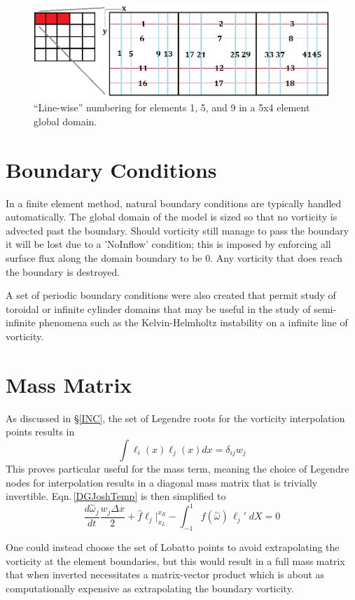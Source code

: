 \documentclass[letterpaper,12pt]{report}
\newcommand{\be}{\begin{equation}}
\newcommand{\ben}[1]{\begin{equation}\label{#1}}
\newcommand{\ee}{\end{equation}}
\newcommand{\aomega}{\overset{\sim}{\omega}}				%
\begin{document}
\begin{figure}
\centering
\includegraphics[width=6in]{streams.PNG}
\caption{\label{fig:streams}``Line-wise'' numbering for elements 1, 5, and 9 in a 5x4 element global domain.}
\end{figure}

%
\section{Boundary Conditions}
In a finite element method, natural boundary conditions are typically handled automatically. The global domain of the model is sized so that no vorticity is advected past the boundary. Should vorticity still manage to pass the boundary it will be lost due to a 'NoInflow' condition; this is imposed by enforcing all surface flux along the domain boundary to be 0. Any vorticity that does reach the boundary is destroyed.

A set of periodic boundary conditions were also created that permit study of toroidal or infinite cylinder domains that may be useful in the study of semi-infinite phenomena such as the Kelvin-Helmholtz instability on a infinite line of vorticity.

%
\section{Mass Matrix}\label{MassM}
As discussed in \S\ref{INC}, the set of Legendre roots for the vorticity interpolation points results in
\be \int \ell_i(x) \ell_j(x) dx = \delta_{ij} w_j \ee
This proves particular useful for the mass term, meaning the choice of Legendre nodes for interpolation results in a diagonal mass matrix that is trivially invertible.  Eqn.\,\eqref{DGJoshTemp} is then simplified to
\ben{DGJoshTemp2} \frac{d \aomega_j}{dt} \frac{w_j \Delta x}{2}
+\hat{f}\ell_j \Big|^{x_R}_{x_L} 
- \int_{-1}^{1} f(\aomega) \, \ell_j' \;dX = 0 \ee

One could instead choose the set of Lobatto points to avoid extrapolating the vorticity at the element boundaries, but this would result in a full mass matrix that when inverted necessitates a matrix-vector product which is about as computationally expensive as extrapolating the boundary vorticity.
\end{document}

